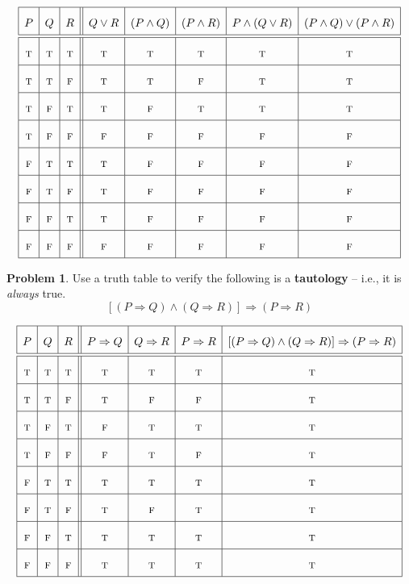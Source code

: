 \documentclass[12pt]{amsart}
\newcounter{problem_number}[section]
\theoremstyle{named}
\theoremstyle{definition}
\newtheorem{problem}{Problem}
\begin{document}
$$
\renewcommand{\arraystretch}{2}
\begin{array}{|c|c|c||c|c|c|c|c|c|}
\hline
P&Q&R& Q \lor R &(P\wedge Q) &(P\wedge R) &P\wedge(Q\vee R) &(P\wedge Q)\vee(P\wedge R)\\
\hline\hline
\textsc{t}&\textsc{t}&\textsc{t}& \textsc{t}&\textsc{t}&\textsc{t} &\textsc{t}& \textsc{t}\\
\hline
\textsc{t}&\textsc{t}&\textsc{f}& \textsc{t}&\textsc{t}&\textsc{f} &\textsc{t}& \textsc{t}\\
\hline
\textsc{t}&\textsc{f}&\textsc{t}& \textsc{t}&\textsc{f}&\textsc{t} &\textsc{t}& \textsc{t}\\
\hline
\textsc{t}&\textsc{f}&\textsc{f}& \textsc{f}&\textsc{f}&\textsc{f} &\textsc{f}& \textsc{f}\\
\hline
\textsc{f}&\textsc{t}&\textsc{t}& \textsc{t}&\textsc{f}&\textsc{f} &\textsc{f}& \textsc{f}\\
\hline
\textsc{f}&\textsc{t}&\textsc{f}& \textsc{t}&\textsc{f}&\textsc{f} &\textsc{f}& \textsc{f}\\
\hline
\textsc{f}&\textsc{f}&\textsc{t}& \textsc{t}&\textsc{f}&\textsc{f} &\textsc{f}& \textsc{f}\\
\hline
\textsc{f}&\textsc{f}&\textsc{f}& \textsc{f}&\textsc{f}&\textsc{f} &\textsc{f}& \textsc{f}\\
\hline
\end{array}
$$

\begin{problem}
	Use a truth table to verify the following is a \textbf{tautology} -- i.e., it is \emph{always} true.
	$$[(P\Rightarrow Q)\wedge(Q\Rightarrow R)]\Rightarrow (P\Rightarrow R)$$
\end{problem}

$$
\renewcommand{\arraystretch}{2}
\begin{array}{|c|c|c||c|c|c|c|}
\hline
P&Q&R&P\Rightarrow Q&Q\Rightarrow R&P\Rightarrow R& [(P\Rightarrow Q)\wedge(Q\Rightarrow R)]\Rightarrow (P\Rightarrow R)\\
\hline\hline
\textsc{t}&\textsc{t}&\textsc{t}&\textsc{t} &\textsc{t} &\textsc{t} &\textsc{t} \\
\hline
\textsc{t}&\textsc{t}&\textsc{f}&\textsc{t} &\textsc{f} &\textsc{f} &\textsc{t} \\
\hline
\textsc{t}&\textsc{f}&\textsc{t}&\textsc{f} &\textsc{t} &\textsc{t} &\textsc{t} \\
\hline
\textsc{t}&\textsc{f}&\textsc{f}&\textsc{f} &\textsc{t} &\textsc{f} &\textsc{t} \\
\hline
\textsc{f}&\textsc{t}&\textsc{t}&\textsc{t} &\textsc{t} &\textsc{t} &\textsc{t} \\
\hline
\textsc{f}&\textsc{t}&\textsc{f}&\textsc{t} &\textsc{f} &\textsc{t} &\textsc{t} \\
\hline
\textsc{f}&\textsc{f}&\textsc{t}&\textsc{t} &\textsc{t} &\textsc{t} &\textsc{t} \\
\hline
\textsc{f}&\textsc{f}&\textsc{f}&\textsc{t} &\textsc{t} &\textsc{t} &\textsc{t} \\
\hline
\end{array}
$$


\end{document}
